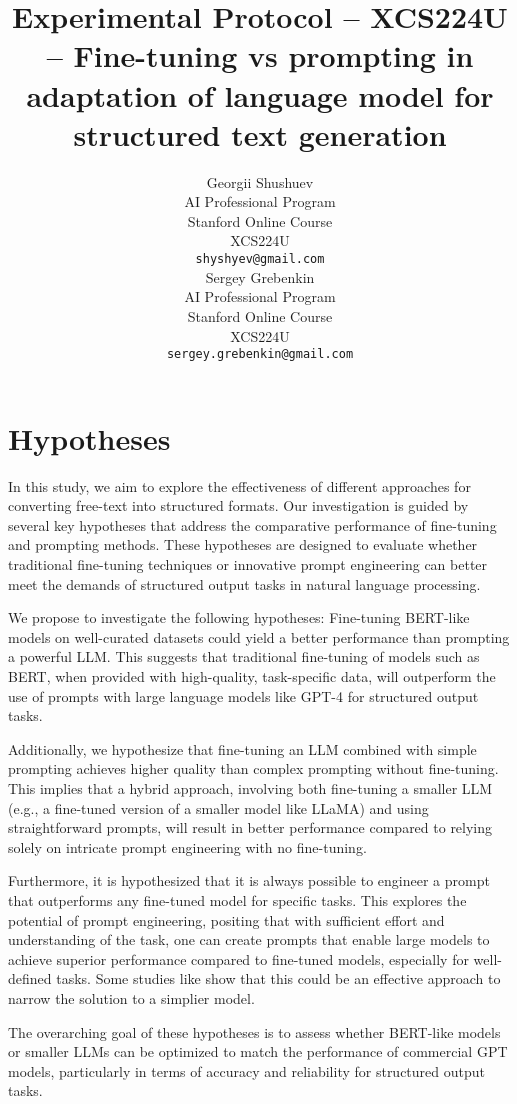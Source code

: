 \documentclass[11pt]{article}
\title{Experimental Protocol – XCS224U – Fine-tuning vs prompting in adaptation of language model for structured text generation}
\author{
  Georgii Shushuev \\
  AI Professional Program \\
  Stanford Online Course \\
  XCS224U \\
  {\tt shyshyev@gmail.com} \\\And
  Sergey Grebenkin \\
  AI Professional Program \\
  Stanford Online Course \\
  XCS224U \\
  {\tt sergey.grebenkin@gmail.com} \\
}
\begin{document}
\maketitle

\section{Hypotheses} 

In this study, we aim to explore the effectiveness of different approaches for converting free-text into structured formats. Our investigation is guided by several key hypotheses that address the comparative performance of fine-tuning and prompting methods. These hypotheses are designed to evaluate whether traditional fine-tuning techniques or innovative prompt engineering can better meet the demands of structured output tasks in natural language processing.

We propose to investigate the following hypotheses: Fine-tuning BERT-like models on well-curated datasets could yield a better performance than prompting a powerful LLM. This suggests that traditional fine-tuning of models such as BERT, when provided with high-quality, task-specific data, will outperform the use of prompts with large language models like GPT-4 for structured output tasks.

Additionally, we hypothesize that fine-tuning an LLM combined with simple prompting achieves higher quality than complex prompting without fine-tuning. This implies that a hybrid approach, involving both fine-tuning a smaller LLM (e.g., a fine-tuned version of a smaller model like LLaMA) and using straightforward prompts, will result in better performance compared to relying solely on intricate prompt engineering with no fine-tuning.

Furthermore, it is hypothesized that it is always possible to engineer a prompt that outperforms any fine-tuned model for specific tasks. This explores the potential of prompt engineering, positing that with sufficient effort and understanding of the task, one can create prompts that enable large models to achieve superior performance compared to fine-tuned models, especially for well-defined tasks. Some studies like \cite{huggingface} show that this could be an effective approach to narrow the solution to a simplier model.

The overarching goal of these hypotheses is to assess whether BERT-like models or smaller LLMs can be optimized to match the performance of commercial GPT models, particularly in terms of accuracy and reliability for structured output tasks.
\end{document}
